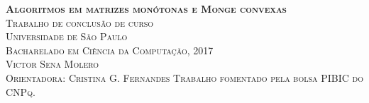 \documentclass[11pt,openany]{book}
\begin{document}

\frontmatter

\thispagestyle{empty}
\begin{center}
\Large \textbf{\textsc{Algoritmos em matrizes monótonas e Monge convexas}} \\[120pt]
\large \textsc{Trabalho de conclusão de curso} \\
\large \textsc{Universidade de São Paulo} \\
\large \textsc{Bacharelado em Ciência da Computação, 2017}\\[120pt]
\large \textsc{Victor Sena Molero} \\
\large \textsc{Orientadora: Cristina G. Fernandes}
\vfill
\large \textsc{Trabalho fomentado pela bolsa PIBIC do CNPq.}
\end{center}





\tableofcontents





\mainmatter







% 




\nocite{*}



\end{document}
